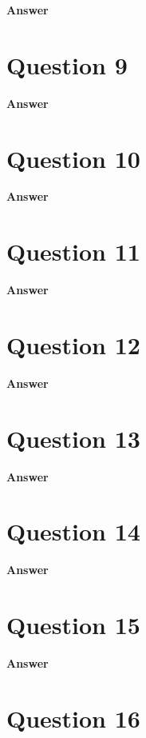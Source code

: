 \documentclass[letterpaper]{article}
\begin{document}
\textbf{Answer}

\clearpage

\section{Question 9}

\textbf{Answer}

\clearpage

\section{Question 10}

\textbf{Answer}

\clearpage

\section{Question 11}

\textbf{Answer}

\clearpage

\section{Question 12}

\textbf{Answer}

\clearpage

\section{Question 13}

\textbf{Answer}

\clearpage

\section{Question 14}

\textbf{Answer}

\clearpage

\section{Question 15}

\textbf{Answer}

\clearpage

\section{Question 16}
\end{document}
